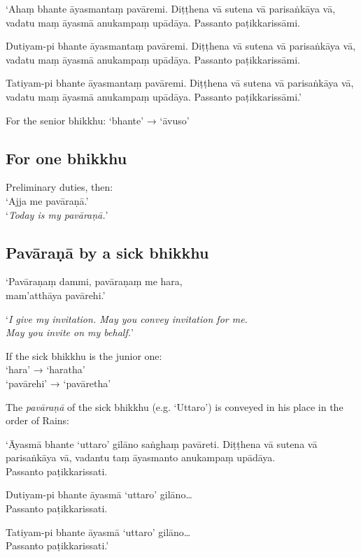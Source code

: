 \begin{paritta}
‘Ahaṃ bhante āyasmantaṃ pavāremi. Diṭṭhena vā sutena vā parisaṅkāya vā, vadatu
maṃ āyasmā anukampaṃ upādāya. Passanto paṭikkarissāmi.

Dutiyam-pi bhante āyasmantaṃ pavāremi. Diṭṭhena vā sutena vā parisaṅkāya vā,
vadatu maṃ āyasmā anukampaṃ upādāya. Passanto paṭikkarissāmi.

Tatiyam-pi bhante āyasmantaṃ pavāremi. Diṭṭhena vā sutena vā parisaṅkāya vā,
vadatu maṃ āyasmā anukampaṃ upādāya. Passanto paṭikkarissāmi.’
\end{paritta}

For the senior bhikkhu: ‘bhante’ → ‘āvuso’ 

\subsection{For one bhikkhu}

Preliminary duties, then:\\
‘Ajja me pavāraṇā.’\\
‘\emph{Today is my pavāraṇā.}’ 

\subsection{Pavāraṇā by a sick bhikkhu}

‘Pavāraṇaṃ dammi, pavāraṇaṃ me hara,\\
mam'atthāya pavārehi.’

‘\emph{I give my invitation. May you convey invitation for me.\\
  May you invite on my behalf.}’ 

If the sick bhikkhu is the junior one:\\
‘hara’ → ‘haratha’\\
‘pavārehi’ → ‘pavāretha’

The \emph{pavāraṇā} of the sick bhikkhu (e.g. ‘Uttaro’) is conveyed in his place
in the order of Rains:

\vspace*{\parskip}

\begin{paritta}
‘Āyasmā bhante ‘uttaro’ gilāno saṅghaṃ pavāreti. Diṭṭhena vā sutena vā
parisaṅkāya vā, vadantu taṃ āyasmanto anukampaṃ upādāya.\\
Passanto paṭikkarissati.

Dutiyam-pi bhante āyasmā ‘uttaro’ gilāno…\\
Passanto paṭikkarissati.

Tatiyam-pi bhante āyasmā ‘uttaro’ gilāno…\\
Passanto paṭikkarissati.’
\end{paritta}


